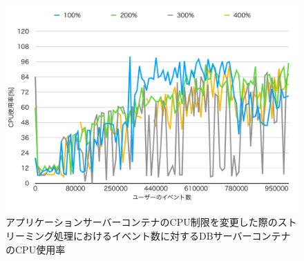 \documentclass[../../../../../main]{subfiles}
\begin{document}
    \begin{figure}[H]
        \centering
        \includegraphics[width=12cm]{graph}
        \caption{アプリケーションサーバーコンテナのCPU制限を変更した際のストリーミング処理におけるイベント数に対するDBサーバーコンテナのCPU使用率}
        \label{fig:stream-change-app-cpu-limit-db-cpu-app_1024-db_1_1024}
    \end{figure}
\end{document}
